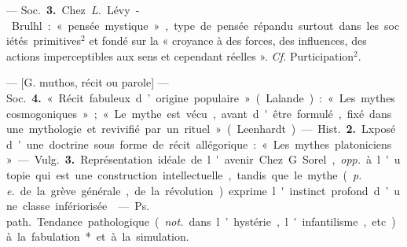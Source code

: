 \begin{itemize}[leftmargin=1cm, label=, itemsep=1pt]
— \si{Soc.} {\bf 3.} Chez {\it L.} Lévy-Brulhl :
« pensée mystique », type de pensée
répandu surtout dans les sociétés
primitives$^2$ et fondé sur la « croyance
à des forces, des influences, des
actions imperceptibles aux sens et
cependant réelles ». {\it Cf.} Purticipation$^2$.

 — [G. muthos, récit ou parole] —
\si{Soc.} {\bf 4.} « Récit fabuleux d’origine
populaire » (Lalande) : « Les mythes
cosmogoniques » ; « Le mythe est
vécu, avant d'être formulé, fixé
dans une mythologie et revivifié par
un rituel » (Leenhardt).

— \si{Hist.} {\bf 2.} Lxposé d’une doctrine sous forme de récit allégorique :
« Les mythes platoniciens ».

— \si{Vulg.} {\bf 3.} Représentation idéale
de l'avenir. Chez G. Sorel, {\it opp.} à
l'utopie qui est une construction
intellectuelle, tandis que le mythe
({\it p. e.} de la grève générale, de la révolution) exprime l'instinct profond
d’une classe infériorisée.

 — \si{Ps. path.} Tendance
pathologique ({\it not.} dans l’hystérie,
l'infantilisme, etc.) à la fabulation*
et à la simulation.

	\end{itemize}
